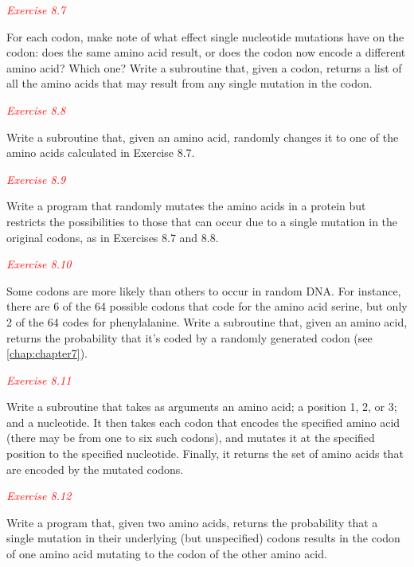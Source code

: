 \textcolor{red}{\textit{Exercise 8.7}}
\begin{adjustwidth}{1cm}{}
For each codon, make note of what effect single nucleotide mutations have on the codon: does the same amino acid result, or does the codon now encode a different amino acid? Which one? Write a subroutine that, given a codon, returns a list of all the amino acids that may result from any single mutation in the codon. 
\end{adjustwidth}

\textcolor{red}{\textit{Exercise 8.8}}
\begin{adjustwidth}{1cm}{}
Write a subroutine that, given an amino acid, randomly changes it to one of the amino acids calculated in Exercise 8.7. 
\end{adjustwidth}

\textcolor{red}{\textit{Exercise 8.9}}
\begin{adjustwidth}{1cm}{}
Write a program that randomly mutates the amino acids in a protein but restricts the possibilities to those that can occur due to a single mutation in the original codons, as in Exercises 8.7 and 8.8.
\end{adjustwidth}

\textcolor{red}{\textit{Exercise 8.10}}
\begin{adjustwidth}{1cm}{}
Some codons are more likely than others to occur in random DNA. For instance, there are 6 of the 64 possible codons that code for the amino acid serine, but only 2 of the 64 codes for phenylalanine. Write a subroutine that, given an amino acid, returns the probability that it's coded by a randomly generated codon (see \autoref{chap:chapter7}). 
\end{adjustwidth}

\textcolor{red}{\textit{Exercise 8.11}}
\begin{adjustwidth}{1cm}{}
Write a subroutine that takes as arguments an amino acid; a position 1, 2, or 3; and a nucleotide. It then takes each codon that encodes the specified amino acid (there may be from one to six such codons), and mutates it at the specified position to the specified nucleotide.  Finally, it returns the set of amino acids that are encoded by the mutated codons. 
\end{adjustwidth}

\textcolor{red}{\textit{Exercise 8.12}}
\begin{adjustwidth}{1cm}{}
Write a program that, given two amino acids, returns the probability that a single mutation in their underlying (but unspecified) codons results in the codon of one amino acid mutating to the codon of the other amino acid. 
\end{adjustwidth}

